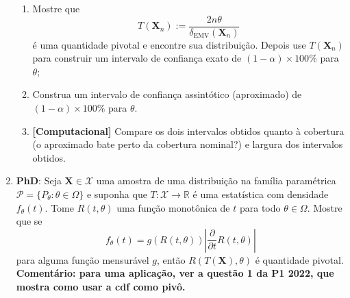 \documentclass[a4paper,10pt, notitlepage]{report}
\newcommand{\bX}{\boldsymbol{X}} %
\begin{document}
\begin{enumerate}
\begin{enumerate}
     \item Mostre que 
     \begin{equation*}
         T(\bX_n) := \frac{2n\theta}{\delta_{\text{EMV}}(\bX_n)}
     \end{equation*}
     é uma quantidade pivotal e encontre sua distribuição.
     Depois use $ T(\bX_n)$ para construir um intervalo de confiança exato de  $(1-\alpha)\times100 \%$ para $\theta$;
     \item Construa um intervalo de confiança assintótico (aproximado) de $(1-\alpha)\times100\%$ para $\theta$.
     \item \textbf{[Computacional]} Compare os dois intervalos obtidos quanto à cobertura (o aproximado bate perto da cobertura nominal?) e largura dos intervalos obtidos.
 \end{enumerate}
 
 \item \textbf{PhD}: Seja $\boldsymbol{X} \in \mathcal{X}$ uma amostra de uma distribuição na família paramétrica $\mathcal{P} = \{P_\theta: \theta \in \Omega \}$ e suponha que $T: \mathcal{X} \to \mathbb{R}$ é uma estatística com densidade $f_\theta(t)$. 
 Tome $R(t, \theta)$ uma função monotônica de $t$ para todo $\theta \in \Omega$.
 Mostre que se
 \begin{equation*}
     f_\theta(t) = g\left(R(t, \theta)\right)\left|\frac{\partial}{\partial t}R(t, \theta)\right|
 \end{equation*}
 para alguma função mensurável $g$, então $R(T(\boldsymbol{X}), \theta)$ é quantidade pivotal.
 \textbf{Comentário: para uma aplicação, ver a questão 1 da P1 2022, que mostra como usar a cdf como pivô.} 
\end{enumerate}
% 
% 
\end{document}
